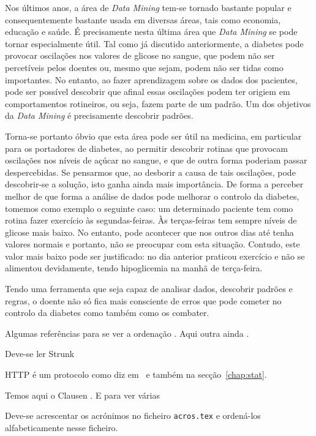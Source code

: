 Nos últimos anos, a área de \textit{Data Mining} tem-se tornado bastante popular e consequentemente bastante usada em diversas áreas, tais como economia, educação e saúde. É precisamente nesta última área que \textit{Data Mining} se pode tornar especialmente útil. Tal como já discutido anteriormente, a diabetes pode provocar oscilações nos valores de glicose no sangue, que podem não ser percetíveis pelos doentes ou, mesmo que sejam, podem não ser tidas como importantes. No entanto, ao fazer aprendizagem sobre os dados dos pacientes, pode ser possível descobrir que afinal essas oscilações podem ter origiem em comportamentos rotineiros, ou seja, fazem parte de um padrão. Um dos objetivos da \textit{Data Mining} é precisamente descobrir padrões. 

Torna-se portanto óbvio que esta área pode ser útil na medicina, em particular para os portadores de diabetes, ao permitir descobrir rotinas que provocam oscilações nos níveis de açúcar no sangue, e que de outra forma poderiam passar despercebidas. Se pensarmos que, ao desborir a causa de tais oscilações, pode descobrir-se a solução, isto ganha ainda mais importância. De forma a perceber melhor de que forma a análise de dados pode melhorar o controlo da diabetes, tomemos como exemplo o seguinte caso: um determinado paciente tem como rotina fazer exercício às segundas-feiras. Às terças-feiras tem sempre níveis de glicose mais baixo. No entanto, pode acontecer que nos outros dias até tenha valores normais e portanto, não se preocupar com esta situação. Contudo, este valor mais baixo pode ser justificado: no dia anterior praticou exercício e não se alimentou devidamente, tendo hipoglicemia na manhã de terça-feira.

Tendo uma ferramenta que seja capaz de analisar dados, descobrir padrões e regras, o doente não só fica mais consciente de erros que pode cometer no controlo da diabetes como também como os combater. 

Algumas referências para se ver a ordenação  \cite{yaacoub2012}. Aqui outra ainda \cite{etsitr102732}.

Deve-se ler Strunk~\cite{strunk2007elements}

\ac{HTTP} é um protocolo como diz em~\cite{test2000} e também na secção~\ref{chap:stat}.

  Temos aqui o Clausen \cite{Clausen2003}. E para ver várias \cite{yaacoub2012, etsitr102732, strunk2007elements}

Deve-se acrescentar os acrónimos no ficheiro \texttt{acros.tex} e ordená-los alfabeticamente nesse ficheiro.



